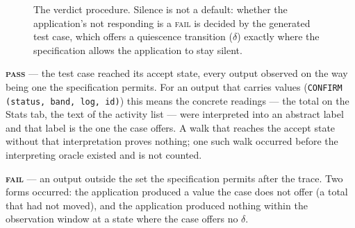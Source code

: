 \documentclass[11pt,a4paper]{article}
\newcommand{\gate}[1]{\texttt{\small #1}}
\begin{document}
\begin{figure}[h]
\centering
{}
\caption{The verdict procedure. Silence is not a default: whether the
application's not responding is a \textsc{fail} is decided by the generated test
case, which offers a quiescence transition ($\delta$) exactly where the
specification allows the application to stay silent.}
\label{fig:verdict}
\end{figure}

\noindent\textbf{\textsc{pass}} --- the test case reached its accept state, every
output observed on the way being one the specification permits. For an output
that carries values (\gate{CONFIRM (status, band, log, id)}) this means the
concrete readings --- the total on the Stats tab, the text of the activity list
--- were interpreted into an abstract label and that label is the one the case
offers. A walk that reaches the accept state without that interpretation proves
nothing; one such walk occurred before the interpreting oracle existed and is
not counted.

\noindent\textbf{\textsc{fail}} --- an output outside the set the specification
permits after the trace. Two forms occurred: the application produced a value the
case does not offer (a total that had not moved), and the application produced
nothing within the observation window at a state where the case offers no
$\delta$.
\end{document}
